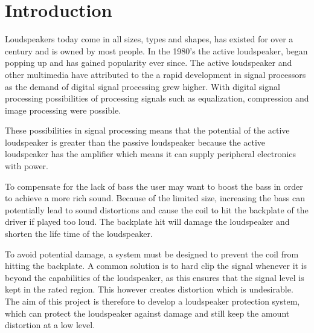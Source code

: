 \chapter{Introduction}
Loudspeakers today come in all sizes, types and shapes, has existed for over a century and is owned by most people. In the 1980's the active loudspeaker, began popping up and has gained popularity ever since. The active loudspeaker and other multimedia have attributed to the a rapid development in signal processors as the demand of digital signal processing grew higher. With digital signal processing possibilities of processing signals such as equalization, compression and image processing were possible.

These possibilities in signal processing means that the potential of the active loudspeaker is greater than the passive loudspeaker because the active loudspeaker has the amplifier which means it can supply peripheral electronics with power.


To compensate for the lack of bass the user may want to boost the bass in order to achieve a more rich sound. Because of the limited size, increasing the bass can potentially lead to sound distortions and cause the coil to hit the backplate of the driver if played too loud. The backplate hit will damage the loudspeaker and shorten the life time of the loudspeaker.

To avoid potential damage, a system must be designed to prevent the coil from hitting the backplate. A common solution is to hard clip the signal whenever it is beyond the capabilities of the loudspeaker, as this ensures that the signal level is kept in the rated region. This however creates distortion which is undesirable. The aim of this project is therefore to develop a loudspeaker protection system, which can protect the loudspeaker against damage and still keep the amount distortion at a low level.





